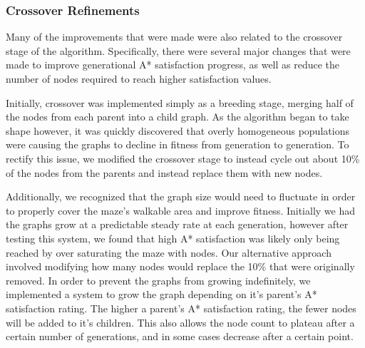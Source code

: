 	\subsubsection{Crossover Refinements}
	Many of the improvements that were made were also related to the crossover stage of the algorithm. Specifically, there were several major changes that were made to improve generational A* satisfaction progress, as well as reduce the number of nodes required to reach higher satisfaction values.
	
	Initially, crossover was implemented simply as a breeding stage, merging half of the nodes from each parent into a child graph. As the algorithm began to take shape however, it was quickly discovered that overly homogeneous populations were causing the graphs to decline in fitness from generation to generation. To rectify this issue, we modified the crossover stage to instead cycle out about 10\% of the nodes from the parents and instead replace them with new nodes.
	
	Additionally, we recognized that the graph size would need to fluctuate in order to properly cover the maze's walkable area and improve fitness. Initially we had the graphs grow at a predictable steady rate at each generation, however after testing this system, we found that high A* satisfaction was likely only being reached by over saturating the maze with nodes. Our alternative approach involved modifying how many nodes would replace the 10\% that were originally removed. In order to prevent the graphs from growing indefinitely, we implemented a system to grow the graph depending on it's parent's A* satisfaction rating. The higher a parent's A* satisfaction rating, the fewer nodes will be added to it's children. This also allows the node count to plateau after a certain number of generations, and in some cases decrease after a certain point.
	
	
	
	
	
	